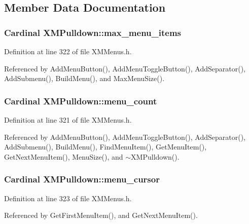 \subsection{Member Data Documentation}
\subsubsection{\setlength{\rightskip}{0pt plus 5cm}Cardinal XMPulldown::max\_\-menu\_\-items\hspace{0.3cm}{\tt  [protected]}}\label{classXMPulldown_n3}




Definition at line 322 of file XMMenus.h.

Referenced by Add\-Menu\-Button(), Add\-Menu\-Toggle\-Button(), Add\-Separator(), Add\-Submenu(), Build\-Menu(), and Max\-Menu\-Size().
\subsubsection{\setlength{\rightskip}{0pt plus 5cm}Cardinal XMPulldown::menu\_\-count\hspace{0.3cm}{\tt  [protected]}}\label{classXMPulldown_n2}




Definition at line 321 of file XMMenus.h.

Referenced by Add\-Menu\-Button(), Add\-Menu\-Toggle\-Button(), Add\-Separator(), Add\-Submenu(), Build\-Menu(), Find\-Menu\-Item(), Get\-Menu\-Item(), Get\-Next\-Menu\-Item(), Menu\-Size(), and $\sim$XMPulldown().
\subsubsection{\setlength{\rightskip}{0pt plus 5cm}Cardinal XMPulldown::menu\_\-cursor\hspace{0.3cm}{\tt  [protected]}}\label{classXMPulldown_n4}




Definition at line 323 of file XMMenus.h.

Referenced by Get\-First\-Menu\-Item(), and Get\-Next\-Menu\-Item().
